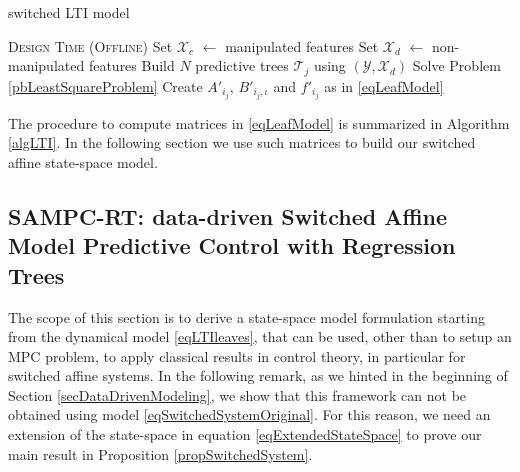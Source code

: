 \documentclass[]{ifacconf}  %
\begin{document}
\normalsize
\begin{algorithm}[t!]
	\caption{switched LTI model}
	\label{algLTI}
	\begin{algorithmic}[1]
		\State \textsc{Design Time (Offline)}
		\State Set $\mathcal{X}_c$ $\gets$ manipulated features
		\State Set $\mathcal{X}_d$ $\gets$ non-manipulated features
		\State Build $N$ predictive trees $\mathcal{T}_j$ using $(\mathcal{Y},\mathcal{X}_d)$ 
		\State Solve Problem \ref{pbLeastSquareProblem}
		\State Create $A'_{i_j}$, $B'_{i_j,\iota}$ and $f'_{i_j}$ as in \eqref{eqLeafModel}
		\EndFor
		\EndFor
		\EndProcedure
	\end{algorithmic}
\end{algorithm}
The procedure to compute matrices in \eqref{eqLeafModel} is summarized in Algorithm \ref{algLTI}.
In the following section we use such matrices to build our switched affine state-space model.

\subsection{SAMPC-RT: data-driven Switched Affine Model Predictive Control with Regression Trees}\label{ssecSAMPC-RT}
The scope of this section is to derive a state-space model formulation starting from the dynamical model \eqref{eqLTIleaves}, that can be used, other than to setup an MPC problem, to apply classical results in control theory, in particular for switched affine systems. 
In the following remark, as we hinted in the beginning of Section \ref{secDataDrivenModeling}, we show that this framework can not be obtained using model \eqref{eqSwitchedSystemOriginal}. 
For this reason, we need an extension of the state-space in equation \eqref{eqExtendedStateSpace} to prove our main result in Proposition \ref{propSwitchedSystem}.
\end{document}
